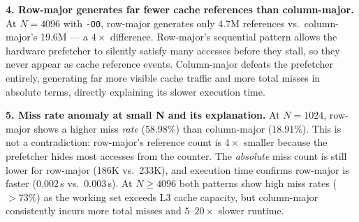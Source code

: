 \documentclass[10pt,a4paper]{article}
\begin{document}
\textbf{4. Row-major generates far fewer cache references than column-major.}
At $N=4096$ with \texttt{-O0}, row-major generates only 4.7M references vs.\ column-major's
19.6M --- a $4\times$ difference. Row-major's sequential pattern allows the hardware prefetcher
to silently satisfy many accesses before they stall, so they never appear as cache reference
events. Column-major defeats the prefetcher entirely, generating far more visible cache traffic
and more total misses in absolute terms, directly explaining its slower execution time.

\textbf{5. Miss rate anomaly at small N and its explanation.}
At $N=1024$, row-major shows a higher miss \emph{rate} (58.98\%) than column-major (18.91\%).
This is not a contradiction: row-major's reference count is $4\times$ smaller because the
prefetcher hides most accesses from the counter. The \emph{absolute} miss count is still lower
for row-major (186K vs.\ 233K), and execution time confirms row-major is faster (0.002\,s
vs.\ 0.003\,s). At $N \geq 4096$ both patterns show high miss rates ($>73\%$) as the working
set exceeds L3 cache capacity, but column-major consistently incurs more total misses and
$5\text{--}20\times$ slower runtime.
\end{document}
